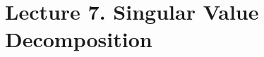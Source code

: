 \section{Lecture 7. Singular Value Decomposition}
\setcounter{theorem}{0}
\begin{multicols}{2}

\newpage
\end{multicols}